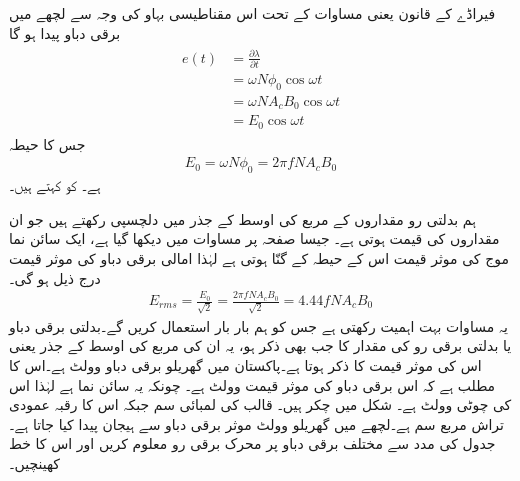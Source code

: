 فیراڈے کے قانون یعنی مساوات   کے تحت اس مقناطیسی بہاو کی وجہ سے لچھے میں  برقی دباو  پیدا ہو گا
\begin{gather}
\begin{aligned}
e(t)&=\frac{\partial \lambda}{\partial t}\\
&=\omega N \phi_0 \cos \omega t \\
&=\omega N A_c B_0 \cos \omega t\\
&=E_0 \cos \omega t
\end{aligned}
\end{gather}
جس کا حیطہ
\begin{align}
E_0=\omega N \phi_0=2 \pi f N A_c B_0
\end{align}
ہے۔ کو  کہتے ہیں۔ 

ہم بدلتی رو مقداروں کے مربع کی اوسط کے جذر  میں دلچسپی رکھتے ہیں جو ان مقداروں کی  قیمت ہوتی ہے۔ جیسا صفحہ  پر مساوات   میں دیکھا گیا ہے، ایک سائن نما  موج کی موثر قیمت اس کے حیطہ کے   گنّا ہوتی ہے لہٰذا امالی برقی دباو کی موثر قیمت  درج ذیل ہو گی۔
\begin{align}\label{مساوات_مقناطیسی_دور_پیدا_دباو_موثر_قیمت}
E_{rms}=\frac{E_0}{\sqrt{2}}=\frac{2 \pi f N A_c B_0}{\sqrt{2}}=4.44 f N A_c B_0
\end{align}
یہ مساوات بہت اہمیت رکھتی ہے  جس کو ہم بار بار استعمال کریں گے۔بدلتی برقی دباو یا بدلتی برقی رو کی مقدار کا جب بھی ذکر ہو، یہ ان کی مربع کی اوسط کے جذر  یعنی اس کی موثر قیمت  کا ذکر ہوتا ہے۔پاکستان میں گھریلو برقی دباو  وولٹ ہے۔اس کا مطلب ہے کہ اس برقی دباو کی موثر قیمت  وولٹ ہے۔ چونکہ یہ سائن نما ہے لہٰذا اس کی چوٹی  وولٹ ہے۔
%
شکل  میں  چکر ہیں۔ قالب کی لمبائی  سم جبکہ اس کا رقبہ عمودی تراش  مربع سم ہے۔لچھے  میں گھریلو  وولٹ موثر برقی دباو سے ہیجان  پیدا کیا جاتا ہے۔جدول  کی مدد سے مختلف برقی دباو پر محرک برقی رو معلوم کریں اور اس کا خط کھینچیں۔

